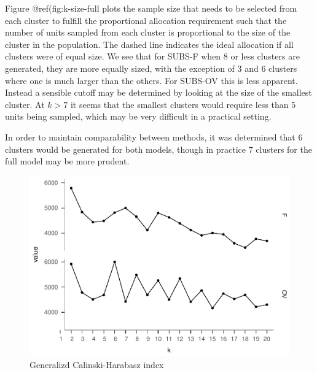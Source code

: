 \documentclass[floatsintext,man]{apa6}
\theoremstyle{definition}
\theoremstyle{definition}
\theoremstyle{definition}
\theoremstyle{remark}
\begin{document}
Figure @ref(fig:k-size-full plots the sample size that needs to be
selected from each cluster to fulfill the proportional allocation
requirement such that the number of units sampled from each cluster is
proportional to the size of the cluster in the population. The dashed
line indicates the ideal allocation if all clusters were of equal size.
We see that for SUBS-F when 8 or less clusters are generated, they are
more equally sized, with the exception of 3 and 6 clusters where one is
much larger than the others. For SUBS-OV this is less apparent. Instead
a sensible cutoff may be determined by looking at the size of the
smallest cluster. At \(k > 7\) it seems that the smallest clusters would
require less than 5 units being sampled, which may be very difficult in
a practical setting.

In order to maintain comparability between methods, it was determined
that 6 clusters would be generated for both models, though in practice 7
clusters for the full model may be more prudent.

\begin{figure}
\centering
\includegraphics{Method_files/figure-latex/ch-full-1.pdf}
\caption{\label{fig:ch-full}Generalizd Calinski-Harabasz index}
\end{figure}
\end{document}
